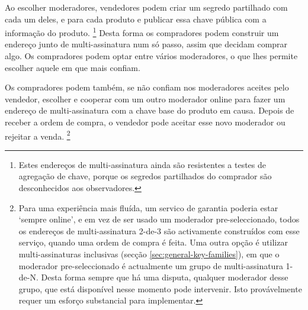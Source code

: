 Ao escolher moderadores, vendedores podem criar um segredo partilhado com cada um deles, e para cada produto e publicar essa chave pública com a informação do produto. 
\footnote{Estes endereços de multi-assinatura ainda são resistentes a testes de agregação de chave, porque os segredos partilhados do comprador são desconhecidos aos observadores.}  
Desta forma os compradores podem construir um endereço junto de multi-assinatura num só passo, assim que decidam comprar algo. Os compradores podem optar entre vários moderadores, o que lhes permite escolher aquele em que mais confiam.  

Os compradores podem também, se não confiam nos moderadores aceites pelo vendedor, escolher e cooperar com um outro moderador online para fazer um endereço de multi-assinatura com a chave base do produto em causa. Depois de receber a ordem de compra, o vendedor pode aceitar esse novo moderador ou rejeitar a venda. 
\footnote{Para uma experiência mais fluída, um servico de garantia poderia estar `sempre online', e em vez de ser usado um moderador pre-seleccionado, todos os endereços de multi-assinatura 2-de-3 são activamente construídos com esse serviço, quando uma ordem de compra é feita. Uma outra opção é utilizar multi-assinaturas inclusivas (secção \ref{sec:general-key-families}), em que o moderador pre-seleccionado é actualmente um grupo de multi-assinatura 1-de-N. Desta forma sempre que há uma disputa, qualquer moderador desse grupo, que está disponível nesse momento pode intervenir. Isto provávelmente requer um esforço substancial para implementar.}     

